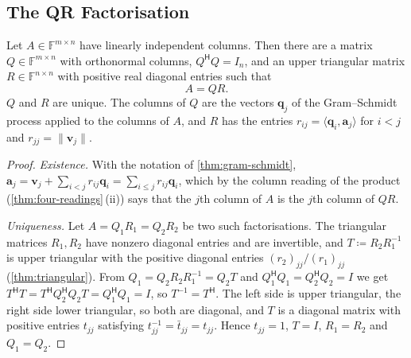 \subsection{The QR Factorisation}

\begin{theorem}[QR factorisation]
\label{thm:qr}
Let $A\in\mathbb F^{m\times n}$ have linearly independent columns. Then there are a matrix $Q\in\mathbb F^{m\times n}$ with orthonormal columns, $Q^{\mathsf H}Q=I_n$, and an upper triangular matrix $R\in\mathbb F^{n\times n}$ with positive real diagonal entries such that
\[
A=QR .
\]
$Q$ and $R$ are unique. The columns of $Q$ are the vectors $\mathbf q_j$ of the Gram--Schmidt process applied to the columns of $A$, and $R$ has the entries $r_{ij}=\langle\mathbf q_i,\mathbf a_j\rangle$ for $i<j$ and $r_{jj}=\|\mathbf v_j\|$.
\end{theorem}

\begin{proof}
\emph{Existence.} With the notation of \cref{thm:gram-schmidt}, $\mathbf a_j=\mathbf v_j+\sum_{i<j}r_{ij}\mathbf q_i=\sum_{i\le j}r_{ij}\mathbf q_i$, which by the column reading of the product (\cref{thm:four-readings}\,(ii)) says that the $j$th column of $A$ is the $j$th column of $QR$.

\emph{Uniqueness.} Let $A=Q_1R_1=Q_2R_2$ be two such factorisations. The triangular matrices $R_1,R_2$ have nonzero diagonal entries and are invertible, and $T\coloneqq R_2R_1^{-1}$ is upper triangular with the positive diagonal entries $(r_2)_{jj}/(r_1)_{jj}$ (\cref{thm:triangular}). From $Q_1=Q_2R_2R_1^{-1}=Q_2T$ and $Q_1^{\mathsf H}Q_1=Q_2^{\mathsf H}Q_2=I$ we get $T^{\mathsf H}T=T^{\mathsf H}Q_2^{\mathsf H}Q_2T=Q_1^{\mathsf H}Q_1=I$, so $T^{-1}=T^{\mathsf H}$. The left side is upper triangular, the right side lower triangular, so both are diagonal, and $T$ is a diagonal matrix with positive entries $t_{jj}$ satisfying $t_{jj}^{-1}=\bar t_{jj}=t_{jj}$. Hence $t_{jj}=1$, $T=I$, $R_1=R_2$ and $Q_1=Q_2$.
\end{proof}

